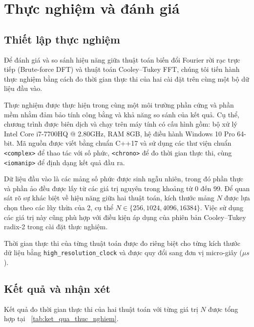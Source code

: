 \section{Thực nghiệm và đánh giá}

\subsection{Thiết lập thực nghiệm}

Để đánh giá và so sánh hiệu năng giữa thuật toán biến đổi Fourier rời rạc trực tiếp (Brute-force DFT) và thuật toán Cooley--Tukey FFT, chúng tôi tiến hành thực nghiệm bằng cách đo thời gian thực thi của hai cài đặt trên cùng một bộ dữ liệu đầu vào.

Thực nghiệm được thực hiện trong cùng một môi trường phần cứng và phần mềm nhằm đảm bảo tính công bằng và khả năng so sánh của kết quả. Cụ thể, chương trình được biên dịch và chạy trên máy tính có cấu hình gồm: bộ xử lý Intel Core i7-7700HQ @ 2.80GHz, RAM 8GB, hệ điều hành Windows 10 Pro 64-bit. Mã nguồn được viết bằng chuẩn C++17 và sử dụng các thư viện chuẩn \texttt{<complex>} để thao tác với số phức, \texttt{<chrono>} để đo thời gian thực thi, cùng \texttt{<iomanip>} để định dạng kết quả đầu ra.

Dữ liệu đầu vào là các mảng số phức được sinh ngẫu nhiên, trong đó phần thực và phần ảo đều được lấy từ các giá trị nguyên trong khoảng từ 0 đến 99. Để quan sát rõ sự khác biệt về hiệu năng giữa hai thuật toán, kích thước mảng $N$ được lựa chọn theo các lũy thừa của 2, cụ thể $N \in \{256, 1024, 4096, 16384\}$. Việc sử dụng các giá trị này cũng phù hợp với điều kiện áp dụng của phiên bản Cooley--Tukey radix-2 trong cài đặt thực nghiệm.

Thời gian thực thi của từng thuật toán được đo riêng biệt cho từng kích thước dữ liệu bằng \texttt{high\_resolution\_clock} và được quy đổi sang đơn vị micro-giây ($\mu s$).

\subsection{Kết quả và nhận xét}

Kết quả đo thời gian thực thi của hai thuật toán với từng giá trị $N$ được tổng hợp tại \tablename~\ref{tab:ket_qua_thuc_nghiem}.

\begin{table}[htbp]
  \centering
  \caption{Bảng so sánh thời gian thực thi giữa Brute-force DFT và Cooley--Tukey FFT}
  \label{tab:ket_qua_thuc_nghiem}
  
\end{table}

